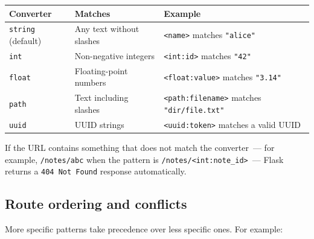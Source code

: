 {\def\LTcaptype{none} %
\begin{longtable}[]{@{}
  >{\raggedright\arraybackslash}p{}
  >{\raggedright\arraybackslash}p{}
  >{\raggedright\arraybackslash}p{}@{}}
\toprule\noalign{}
\begin{minipage}[b]{\linewidth}\raggedright
Converter
\end{minipage} & \begin{minipage}[b]{\linewidth}\raggedright
Matches
\end{minipage} & \begin{minipage}[b]{\linewidth}\raggedright
Example
\end{minipage} \\
\midrule\noalign{}
\endhead
\bottomrule\noalign{}
\endlastfoot
\texttt{string} (default) & Any text without slashes & \texttt{\textless{}name\textgreater{}} matches \texttt{"alice"} \\
\texttt{int} & Non-negative integers & \texttt{\textless{}int:id\textgreater{}} matches \texttt{"42"} \\
\texttt{float} & Floating-point numbers & \texttt{\textless{}float:value\textgreater{}} matches \texttt{"3.14"} \\
\texttt{path} & Text including slashes & \texttt{\textless{}path:filename\textgreater{}} matches \texttt{"dir/file.txt"} \\
\texttt{uuid} & UUID strings & \texttt{\textless{}uuid:token\textgreater{}} matches a valid UUID \\
\end{longtable}
}

If the URL contains something that does not match the converter~--- for example, \texttt{/notes/abc} when the pattern is \texttt{/}\allowbreak{}\texttt{notes/}\allowbreak{}\texttt{\textless{}int:note\_id\textgreater{}}~--- Flask returns a \texttt{404\ Not\ Found} response automatically.

\subsection*{Route ordering and conflicts}\label{04-request-handling-paths:route-ordering-and-conflicts}

More specific patterns take precedence over less specific ones. For example:

